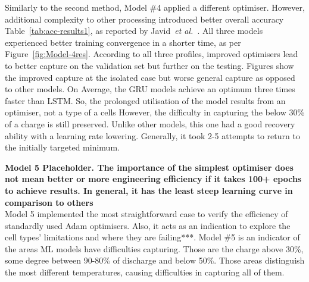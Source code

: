 %
%
Similarly to the second method, Model \#4 applied a different optimiser.
However, additional complexity to other processing introduced better overall accuracy Table~\ref{tab:acc-results1}, as reported by Javid~\textit{et al.}~\cite{javid_adaptive_2020}.
All three models experienced better training convergence in a shorter time, as per Figure~\ref{fig:Model-4res}.
According to all three profiles, improved optimisers lead to better capture on the validation set but further on the testing.
Figures show the improved capture at the isolated case but worse general capture as opposed to other models.
On Average, the GRU models achieve an optimum three times faster than LSTM.
So, the prolonged utilisation of the model results from an optimiser, not a type of a cells
However, the difficulty in capturing the below 30\% of a charge is still preserved.
Unlike other models, this one had a good recovery ability with a learning rate lowering.
Generally, it took 2-5 attempts to return to the initially targeted minimum.

%
%
\textbf{Model 5 Placeholder. The importance of the simplest optimiser does not mean better or more engineering efficiency if it takes 100+ epochs to achieve results. In general, it has the least steep learning curve in comparison to others} \\
Model 5 implemented the most straightforward case to verify the efficiency of standardly used Adam optimisers.
Also, it acts as an indication to explore the cell types' limitations and where they are failing***.
Model \#5 is an indicator of the areas ML models have difficulties capturing.
Those are the charge above 30\%, some degree between 90-80\% of discharge and below 50\%.
Those areas distinguish the most different temperatures, causing difficulties in capturing all of them.

